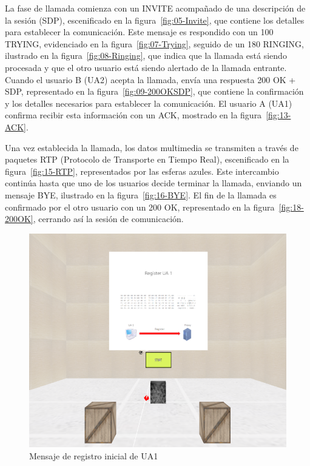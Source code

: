 \documentclass[a4paper, 12pt]{book}
\begin{document}
La fase de llamada comienza con un INVITE acompañado de una descripción de la sesión (SDP), escenificado en la figura~\ref{fig:05-Invite}, 
que contiene los detalles para establecer la comunicación. 
Este mensaje es respondido con un 100 TRYING, evidenciado en la figura~\ref{fig:07-Trying},
seguido de un 180 RINGING, ilustrado en la figura~\ref{fig:08-Ringing}, 
que indica que la llamada está siendo procesada y que el otro usuario está siendo alertado de la llamada entrante. 
Cuando el usuario B (UA2) acepta la llamada, envía una respuesta 200 OK + SDP, representado en la figura~\ref{fig:09-200OKSDP}, 
que contiene la confirmación y los detalles necesarios para establecer la comunicación. 
El usuario A (UA1) confirma recibir esta información con un ACK, mostrado en la figura~\ref{fig:13-ACK}.
\bigskip

Una vez establecida la llamada, los datos multimedia se transmiten a través de 
paquetes RTP (Protocolo de Transporte en Tiempo Real), escenificado en la figura~\ref{fig:15-RTP}, 
representados por las esferas azules. Este intercambio continúa hasta que uno de los usuarios decide terminar la llamada, 
enviando un mensaje BYE, ilustrado en la figura~\ref{fig:16-BYE}. 
El fin de la llamada es confirmado por el otro usuario con un 200 OK, representado en la figura~\ref{fig:18-200OK}, 
cerrando así la sesión de comunicación.
\begin{figure}
  \centering
  \includegraphics[width=12cm, keepaspectratio]{img/resultados/01-Register_UA1.png}
  \caption{Mensaje de registro inicial de UA1}
  \label{fig:01-Register_UA1}
\end{figure}
\end{document}
